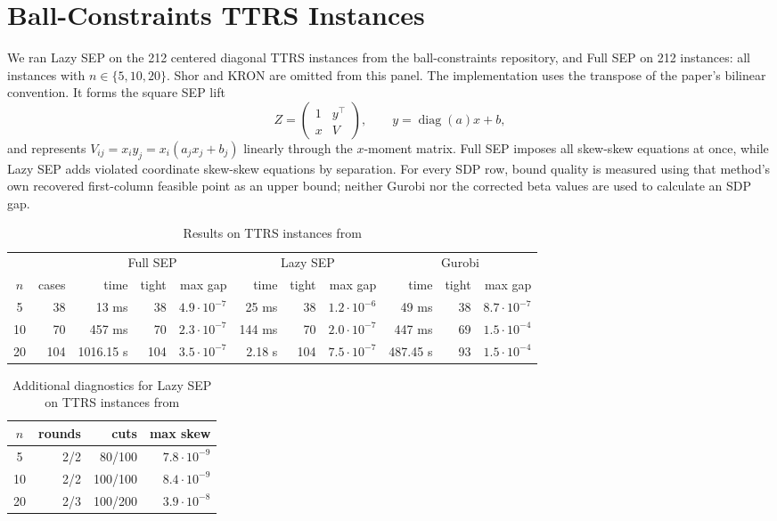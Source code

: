 \documentclass[11pt]{article}
\begin{document}
\section{Ball-Constraints TTRS Instances}
\noindent We ran Lazy SEP on the 212 centered diagonal TTRS instances from
the ball-constraints repository, and Full SEP on 212 instances:
all instances with \(n\in\{5, 10, 20\}\).  Shor and KRON are omitted from this panel.  The implementation uses the
transpose of the paper's bilinear convention.  It forms the square SEP lift
\[
Z=\begin{pmatrix}1&y^\top\\ x&V\end{pmatrix},\qquad
y=\operatorname{diag}(a)x+b,
\]
and represents \(V_{ij}=x_i y_j=x_i(a_jx_j+b_j)\) linearly through the
\(x\)-moment matrix.  Full SEP imposes all skew-skew equations at once, while
Lazy SEP adds violated coordinate skew-skew equations by separation.  For every SDP row, bound quality is measured using that method's own recovered first-column feasible point as an upper bound; neither Gurobi nor the corrected beta values are used to calculate an SDP gap.

\begin{table}[htbp]
\centering
\caption{Results on TTRS instances from \cite{Burer.Anstreicher.2013}}
\label{tab:TTRS_results}
\vskip 10pt
\begingroup
\setlength{\tabcolsep}{3pt}
\small
\begin{tabular}{c r|r r r| r r r|r r r }
\hline
\multicolumn{2}{c|}{} & \multicolumn{3}{c|}{Full SEP} & \multicolumn{3}{c|}{Lazy SEP}& \multicolumn{3}{c}{Gurobi} \\
\(n\) & cases & time & tight & max gap & time & tight & max gap   & time&tight&max gap \\
\hline
5 & 38 & 13 ms & 38 & $4.9\cdot 10^{-7}$ & 25 ms & 38 & $1.2\cdot 10^{-6}$ & 49 ms & 38 & $8.7\cdot 10^{-7}$ \\
10 & 70 & 457 ms & 70 & $2.3\cdot 10^{-7}$ & 144 ms & 70 & $2.0\cdot 10^{-7}$ & 447 ms & 69 & $1.5\cdot 10^{-4}$ \\
20 & 104 & 1016.15 s & 104 & $3.5\cdot 10^{-7}$ & 2.18 s & 104 & $7.5\cdot 10^{-7}$ & 487.45 s & 93 & $1.5\cdot 10^{-4}$ \\
\hline
\hline
\end{tabular}
\endgroup
\end{table}

\begin{table}[htbp]
\centering
\caption{Additional diagnostics for Lazy SEP on TTRS instances from \cite{Burer.Anstreicher.2013}}
\label{tab:TTRS_diagnostics}
\vskip 10pt
\begingroup
\begin{tabular}{c|r r r}
\hline
$n$& rounds & cuts&max skew\\
\hline
5 & 2/2 & 80/100 & $7.8\cdot 10^{-9}$\\
10 & 2/2 & 100/100 & $8.4\cdot 10^{-9}$\\
20 & 2/3 & 100/200 & $3.9\cdot 10^{-8}$\\
\hline
\hline
\end{tabular}
\endgroup
\end{table}
\end{document}
